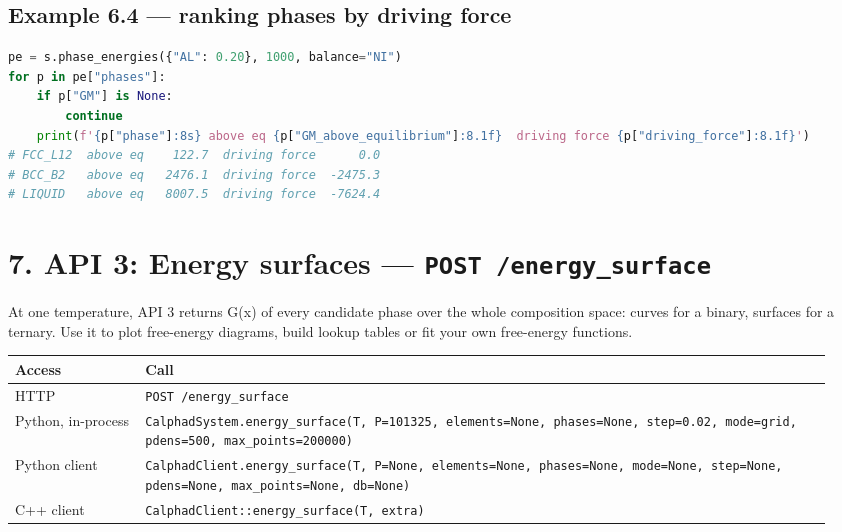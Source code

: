\documentclass[12pt,a4paper]{article}
\begin{document}
\subsection*{Example 6.4 --- ranking phases by driving force}
\begin{lstlisting}[basicstyle={\scriptsize\ttfamily},language=Python]
pe = s.phase_energies({"AL": 0.20}, 1000, balance="NI")
for p in pe["phases"]:
    if p["GM"] is None:
        continue
    print(f'{p["phase"]:8s} above eq {p["GM_above_equilibrium"]:8.1f}  driving force {p["driving_force"]:8.1f}')
# FCC_L12  above eq    122.7  driving force      0.0
# BCC_B2   above eq   2476.1  driving force  -2475.3
# LIQUID   above eq   8007.5  driving force  -7624.4
\end{lstlisting}

\section*{7. API 3: Energy surfaces --- \texttt{POST /\allowbreak{}energy\_\allowbreak{}surface}}
At one temperature, API 3 returns G(x) of every candidate phase over the whole composition space: curves for a binary, surfaces for a ternary. Use it to plot free-energy diagrams, build lookup tables or fit your own free-energy functions.

\begingroup\small
\begin{longtable}{>{\raggedright\arraybackslash}p{0.155\linewidth}>{\raggedright\arraybackslash}p{0.792\linewidth}}
\toprule
\textbf{Access} & \textbf{Call} \\
\midrule
\endhead
HTTP & \texttt{POST /\allowbreak{}energy\_\allowbreak{}surface} \\
Python, in-process & \texttt{CalphadSystem.\allowbreak{}energy\_\allowbreak{}surface(T,\allowbreak{} P=101325,\allowbreak{} elements=None,\allowbreak{} phases=None,\allowbreak{} step=0.\allowbreak{}02,\allowbreak{} mode=\textquotedbl{}grid\textquotedbl{},\allowbreak{} pdens=500,\allowbreak{} max\_\allowbreak{}points=200000)} \\
Python client & \texttt{CalphadClient.\allowbreak{}energy\_\allowbreak{}surface(T,\allowbreak{} P=None,\allowbreak{} elements=None,\allowbreak{} phases=None,\allowbreak{} mode=None,\allowbreak{} step=None,\allowbreak{} pdens=None,\allowbreak{} max\_\allowbreak{}points=None,\allowbreak{} db=None)} \\
C++ client & \texttt{CalphadClient::energy\_\allowbreak{}surface(T,\allowbreak{} extra)} \\
\bottomrule
\end{longtable}
\endgroup
\end{document}
